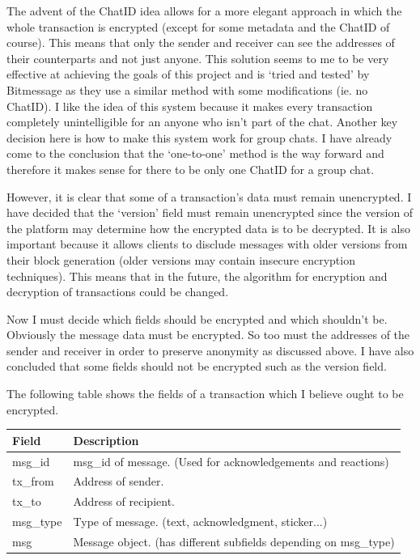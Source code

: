 \documentclass{article}
\begin{document}
The advent of the ChatID idea allows for a more elegant approach in which the whole transaction is encrypted (except for some metadata and the ChatID of course). This means that only the sender and receiver can see the addresses of their counterparts and not just anyone. This solution seems to me to be very effective at achieving the goals of this project and is `tried and tested' by Bitmessage as they use a similar method with some modifications (ie. no ChatID). I like the idea of this system because it makes every transaction completely unintelligible for an anyone who isn't part of the chat. Another key decision here is how to make this system work for group chats. I have already come to the conclusion that the `one-to-one' method is the way forward and therefore it makes sense for there to be only one ChatID for a group chat.

However, it is clear that some of a transaction's data must remain unencrypted. I have decided that the `version' field must remain unencrypted since the version of the platform may determine how the encrypted data is to be decrypted. It is also important because it allows clients to disclude messages with older versions from their block generation (older versions may contain insecure encryption techniques). This means that in the future, the algorithm for encryption and decryption of transactions could be changed.

Now I must decide which fields should be encrypted and which shouldn't be. Obviously the message data must be encrypted. So too must the addresses of the sender and receiver in order to preserve anonymity as discussed above. I have also concluded that some fields should not be encrypted such as the version field.

The following table shows the fields of a transaction which I believe ought to be encrypted.
\begin{table}[H]
\centering
\begin{tabular}{|p{2.5cm}|p{8.5cm}|}
\hline
\rowcolor{tblgrey}
Field & Description\\ \hline
msg\_id     & msg\_id of message. (Used for acknowledgements and reactions)\\ \hline
tx\_from    & Address of sender.                       \\ \hline
tx\_to      & Address of recipient.                                        \\ \hline
msg\_type   & Type of message. (text, acknowledgment, sticker...)          \\ \hline
msg         & Message object. (has different subfields depending on msg\_type) \\ \hline
\end{tabular}
\end{table}
\end{document}
